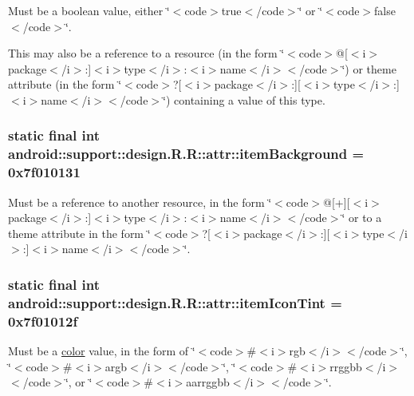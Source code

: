 Must be a boolean value, either \char`\"{}$<$code$>$true$<$/code$>$\char`\"{} or \char`\"{}$<$code$>$false$<$/code$>$\char`\"{}. 

This may also be a reference to a resource (in the form \char`\"{}$<$code$>$@\mbox{[}$<$i$>$package$<$/i$>$:\mbox{]}$<$i$>$type$<$/i$>$:$<$i$>$name$<$/i$>$$<$/code$>$\char`\"{}) or theme attribute (in the form \char`\"{}$<$code$>$?\mbox{[}$<$i$>$package$<$/i$>$:\mbox{]}\mbox{[}$<$i$>$type$<$/i$>$:\mbox{]}$<$i$>$name$<$/i$>$$<$/code$>$\char`\"{}) containing a value of this type. \hypertarget{classandroid_1_1support_1_1design_1_1_r_1_1attr_81cf03f9dac543dfc4ddd7ef30bcc532}{
\subsubsection[{itemBackground}]{\setlength{\rightskip}{0pt plus 5cm}static final int android::support::design.R.R::attr::itemBackground = 0x7f010131}}
\label{classandroid_1_1support_1_1design_1_1_r_1_1attr_81cf03f9dac543dfc4ddd7ef30bcc532}


Must be a reference to another resource, in the form \char`\"{}$<$code$>$@\mbox{[}+\mbox{]}\mbox{[}$<$i$>$package$<$/i$>$:\mbox{]}$<$i$>$type$<$/i$>$:$<$i$>$name$<$/i$>$$<$/code$>$\char`\"{} or to a theme attribute in the form \char`\"{}$<$code$>$?\mbox{[}$<$i$>$package$<$/i$>$:\mbox{]}\mbox{[}$<$i$>$type$<$/i$>$:\mbox{]}$<$i$>$name$<$/i$>$$<$/code$>$\char`\"{}. \hypertarget{classandroid_1_1support_1_1design_1_1_r_1_1attr_44b0f44881174ff873abc8de6feaad53}{
\subsubsection[{itemIconTint}]{\setlength{\rightskip}{0pt plus 5cm}static final int android::support::design.R.R::attr::itemIconTint = 0x7f01012f}}
\label{classandroid_1_1support_1_1design_1_1_r_1_1attr_44b0f44881174ff873abc8de6feaad53}


Must be a \hyperlink{classandroid_1_1support_1_1design_1_1_r_1_1color}{color} value, in the form of \char`\"{}$<$code$>$\#$<$i$>$rgb$<$/i$>$$<$/code$>$\char`\"{}, \char`\"{}$<$code$>$\#$<$i$>$argb$<$/i$>$$<$/code$>$\char`\"{}, \char`\"{}$<$code$>$\#$<$i$>$rrggbb$<$/i$>$$<$/code$>$\char`\"{}, or \char`\"{}$<$code$>$\#$<$i$>$aarrggbb$<$/i$>$$<$/code$>$\char`\"{}. 

